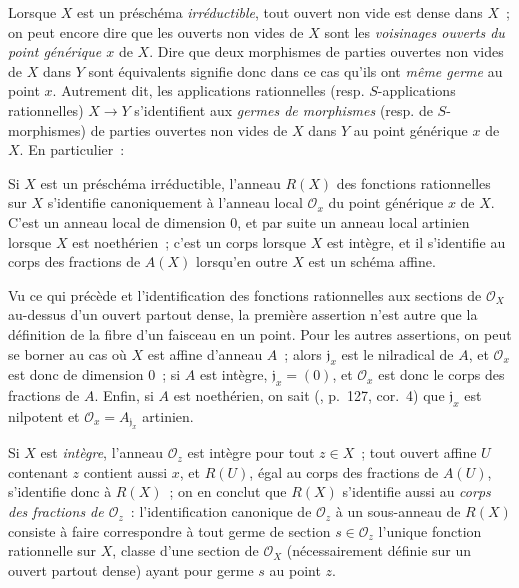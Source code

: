 \begin{env}[7.1.4]
\label{I.7.1.4-fr}
Lorsque $X$ est un préschéma \emph{irréductible}, tout ouvert non vide est dense
dans $X$~; on peut encore dire que les ouverts non vides de $X$ sont les
\emph{voisinages ouverts du point générique $x$} de $X$. Dire que deux
morphismes de parties ouvertes non vides de $X$ dans $Y$ sont équivalents
signifie donc dans ce cas qu'ils ont \emph{même germe} au point $x$. Autrement
dit, les applications rationnelles (resp. $S$-applications rationnelles)
$X\to Y$ s'identifient aux \emph{germes de morphismes} (resp. de
$S$-morphismes) de parties ouvertes non vides de $X$ dans $Y$ au point
générique $x$ de $X$. En particulier~:
\end{env}

\begin{proposition}[7.1.5]
\label{I.7.1.5-fr}
Si $X$ est un préschéma irréductible, l'anneau $R(X)$ des fonctions rationnelles
sur $X$ s'identifie canoniquement à l'anneau local $\mathscr{O}_x$ du point
générique $x$ de $X$. C'est un anneau local de dimension 0, et par suite un
anneau local artinien lorsque $X$ est noethérien~; c'est un corps lorsque $X$
est intègre, et il s'identifie au corps des fractions de $A(X)$ lorsqu'en outre
$X$ est un schéma affine.
\end{proposition}

Vu ce qui précède et l'identification des fonctions rationnelles aux sections
de $\mathscr{O}_X$ au-dessus d'un ouvert partout dense, la première assertion
n'est autre que la définition de la fibre d'un faisceau en un point. Pour les
autres assertions, on peut se borner au cas où $X$ est affine d'anneau $A$~;
alors $\mathfrak{j}_x$ est le nilradical de $A$, et $\mathscr{O}_x$ est donc de
dimension 0~; si $A$ est intègre, $\mathfrak{j}_x=(0)$, et $\mathscr{O}_x$ est
donc le corps des fractions de $A$. Enfin, si $A$ est noethérien, on sait
(\cite{I-11}, p.~127, cor.~4) que $\mathfrak{j}_x$ est nilpotent et
$\mathscr{O}_x=A_{\mathfrak{j}_x}$ artinien.

Si $X$ est \emph{intègre}, l'anneau $\mathscr{O}_z$ est intègre pour tout
$z\in X$~; tout ouvert affine $U$ contenant $z$ contient aussi $x$, et $R(U)$,
égal au corps des fractions de $A(U)$, s'identifie donc à $R(X)$~; on en
conclut que $R(X)$ s'identifie aussi au
\emph{corps des fractions de $\mathscr{O}_z$}~: l'identification canonique de
$\mathscr{O}_z$ à un sous-anneau de $R(X)$ consiste à faire correspondre à tout
germe de section $s\in\mathscr{O}_z$ l'unique fonction rationnelle sur $X$,
classe d'une section de $\mathscr{O}_X$ (nécessairement définie sur un ouvert
partout dense) ayant pour germe $s$ au point $z$.


